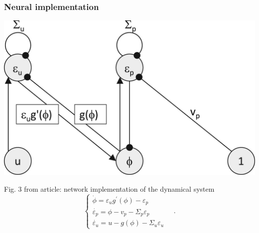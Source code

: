 \documentclass[aspectratio=43]{beamer}
\begin{document}
\begin{frame}
  \frametitle{Neural implementation}
  \begin{center}
    \includegraphics[width=0.5\textheight]{Fig3}
  \end{center}
  Fig. 3 from article: network implementation of the dynamical system
  \begin{equation}
    \label{eq:dynamical_system_single}
    \begin{cases}
      \dot{\phi} = \varepsilon_u g^\prime(\phi) - \varepsilon_p \\
      \dot{\varepsilon_p} = \phi - v_p - \Sigma_p \varepsilon_p \\
      \dot{\varepsilon_u} = u - g(\phi) - \Sigma_u \varepsilon_u
    \end{cases}
    \quad .
  \end{equation}
\end{frame}

\end{document}
